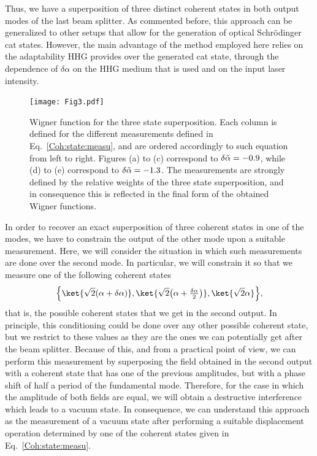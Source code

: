 Thus, we have a superposition of three distinct coherent states in both output modes of the last beam splitter. As commented before, this approach can be generalized to other setups that allow for the generation of optical Schrödinger cat states. However, the main advantage of the method employed here relies on the adaptability HHG provides over the generated cat state, through the dependence of $\delta \alpha$ on the HHG medium that is used and on the input laser intensity.
\begin{figure}
    \centering
    \texttt{[image: Fig3.pdf]}
    \caption{Wigner function for the three state superposition. Each column is defined for the different measurements defined in Eq.~\eqref{Coh:state:measu}, and are ordered accordingly to such equation from left to right. Figures (a) to (c) correspond to $\delta \Tilde{\alpha} = -0.9$, while (d) to (e) correspond to $\delta \Tilde{\alpha} = -1.3$. The measurements are strongly defined by the relative weights of the three state superposition, and in consequence this is reflected in the final form of the obtained Wigner functions.}
    \label{Fig3}
\end{figure}
In order to recover an exact superposition of three coherent states in one of the modes, we have to constrain the output of the other mode upon a suitable measurement. Here, we will consider the situation in which such measurements are done over the second mode. In particular, we will constrain it so that we measure one of the following coherent states
\begin{equation}\label{Coh:state:measu}
    \Big\{\ket{\sqrt{2}(\alpha + \delta \alpha)},
       \ket{\sqrt{2}\big(\alpha + \tfrac{\delta \alpha}{2}\big)},
       \ket{\sqrt{2}\alpha}
    \Big\},
\end{equation}
that is, the possible coherent states that we get in the second output. In principle, this conditioning could be done over any other possible coherent state, but we restrict to these values as they are the ones we can potentially get after the beam splitter. Because of this, and from a practical point of view, we can perform this measurement by superposing the field obtained in the second output with a coherent state that has one of the previous amplitudes, but with a phase shift of half a period of the fundamental mode. Therefore, for the case in which the amplitude of both fields are equal, we will obtain a destructive interference which leads to a vacuum state. In consequence, we can understand this approach as the measurement of a vacuum state after performing a suitable displacement operation determined by one of the coherent states given in Eq.~\eqref{Coh:state:measu}.

